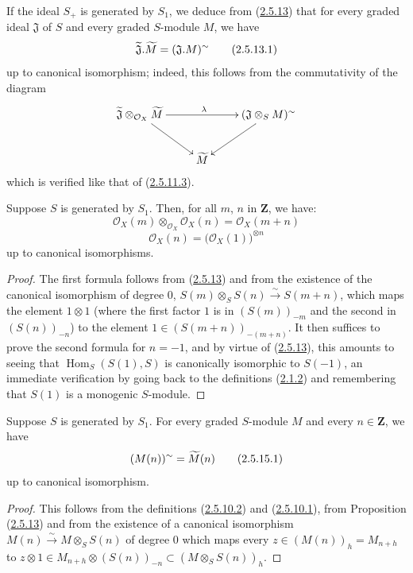 If the ideal $S_+$ is generated by $S_1$, we deduce from
(\hyperref[II.2.5.13]{2.5.13}) that for every graded ideal $\mathfrak{J}$
of $S$ and every graded $S$-module $M$, we have
\[
\label{II.2.5.13.1}
  \widetilde{\mathfrak{J}}.\widetilde{M}
  =(\mathfrak{J}.M)^{\sim}
\tag{2.5.13.1}
\]
up to canonical isomorphism; indeed, this follows from the commutativity
of the diagram
\[
  \xymatrix{
    \widetilde{\mathfrak{J}}\otimes_{\mathcal{O}_X}\widetilde{M}
    \ar[rr]^\lambda\ar[dr]
    && (\mathfrak{J}\otimes_S M)\supertilde\ar[dl]\\
    & \widetilde{M} &
  }
\]
which is verified like that of
(\hyperref[II.2.5.11.3]{2.5.11.3}).

\begin{corollary}[2.5.14]
\label{II.2.5.14}
Suppose $S$ is generated by $S_1$. Then, for all $m$, $n$ in
$\mathbf{Z}$, we have:
\[
\label{II.2.5.14.1}
  \mathcal{O}_X(m)\otimes_{\mathcal{O}_X}\mathcal{O}_X(n)
  =\mathcal{O}_X(m+n)
\tag{2.5.14.1}
\]
\[
\label{II.2.5.14.2}
  \mathcal{O}_X(n)=\bigl(\mathcal{O}_X(1)\bigr)^{\otimes n}
\tag{2.5.14.2}
\]
up to canonical isomorphisms.
\end{corollary}

\begin{proof}
The first formula follows from (\hyperref[II.2.5.13]{2.5.13}) and from
the existence of the canonical isomorphism of degree $0$,
$S(m)\otimes_S S(n)\xrightarrow{\sim}S(m+n)$, which maps the element
$1\otimes 1$ (where the first factor $1$ is in $(S(m))_{-m}$ and the second
in $(S(n))_{-n}$) to the element
$1\in(S(m+n))_{-(m+n)}$. It then suffices to prove the second formula
for $n=-1$, and by virtue of (\hyperref[II.2.5.13]{2.5.13}), this amounts
to seeing that $\operatorname{Hom}_S(S(1),S)$ is canonically isomorphic to
$S(-1)$, an immediate verification by going back to the definitions
(\hyperref[II.2.1.2]{2.1.2}) and remembering that $S(1)$ is a
monogenic $S$-module.
\end{proof}

\begin{corollary}[2.5.15]
\label{II.2.5.15}
Suppose $S$ is generated by $S_1$. For every graded $S$-module $M$ and
every $n\in\mathbf{Z}$, we have
\[
\label{II.2.5.15.1}
  (M(n))^{\sim}=\widetilde{M}(n)
\tag{2.5.15.1}
\]
up to canonical isomorphism.
\end{corollary}

\begin{proof}
This follows from the definitions (\hyperref[II.2.5.10.2]{2.5.10.2}) and
(\hyperref[II.2.5.10.1]{2.5.10.1}), from Proposition
(\hyperref[II.2.5.13]{2.5.13}) and from the existence of a canonical
isomorphism $M(n)\xrightarrow{\sim}M\otimes_S S(n)$ of degree $0$ which maps
every $z\in(M(n))_h=M_{n+h}$ to
$z\otimes1\in M_{n+h}\otimes(S(n))_{-n}\subset(M\otimes_S S(n))_h$.
\end{proof}

